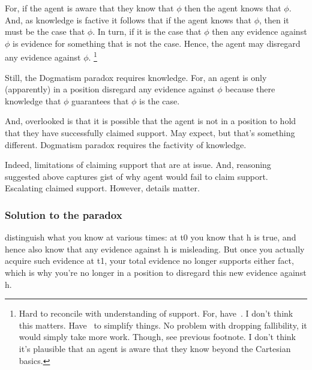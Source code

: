 \begin{note}
  For, if the agent is aware that they know that \(\phi\) then the agent knows that \(\phi\).
  And, as knowledge is factive it follows that if the agent knows that \(\phi\), then it must be the case that \(\phi\).
  In turn, if it is the case that \(\phi\) then any evidence against \(\phi\) is evidence for something that is not the case.
  Hence, the agent may disregard any evidence against \(\phi\).\nolinebreak
  \footnote{
    Hard to reconcile with understanding of support.
    For, have~\nfcs{}.
    I don't think this matters.
    Have~\nfcs{} to simplify things.
    No problem with dropping fallibility, it would simply take more work.
    Though, see previous footnote.
    I don't think it's plausible that an agent is aware that they know beyond the Cartesian basics.
  }

  Still, the Dogmatism paradox requires knowledge.
  For, an agent is only (apparently) in a position disregard any evidence against \(\phi\) because there knowledge that \(\phi\) guarantees that \(\phi\) is the case.

  And, overlooked is that it is possible that the agent is not in a position to hold that they have successfully claimed support.
  May expect, but that's something different.
  Dogmatism paradox requires the factivity of knowledge.

  Indeed, limitations of claiming support that are at issue.
  And, reasoning suggested above captures gist of why agent would fail to claim support.
  Escalating claimed support.
  However, details matter.
\end{note}

\subsubsection{Solution to the paradox}

\begin{note}
  distinguish what you know at various times: at t0 you know that h is true, and hence also know that any evidence against h is misleading. But once you actually acquire such evidence at t1, your total evidence no longer supports either fact, which is why you're no longer in a position to disregard this new evidence against h.
\end{note}



